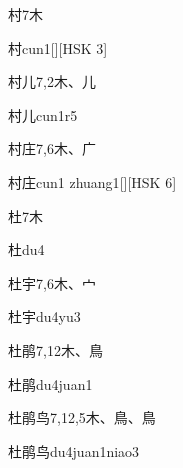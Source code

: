 \begin{Entry}{村}{7}{⽊}
  \begin{Phonetics}{村}{cun1}[][HSK 3]
  \end{Phonetics}
\end{Entry}

\begin{Entry}{村儿}{7,2}{⽊、⼉}
  \begin{Phonetics}{村儿}{cun1r5}
  \end{Phonetics}
\end{Entry}

\begin{Entry}{村庄}{7,6}{⽊、⼴}
  \begin{Phonetics}{村庄}{cun1 zhuang1}[][HSK 6]
  \end{Phonetics}
\end{Entry}

\begin{Entry}{杜}{7}{⽊}
  \begin{Phonetics}{杜}{du4}
  \end{Phonetics}
\end{Entry}

\begin{Entry}{杜宇}{7,6}{⽊、⼧}
  \begin{Phonetics}{杜宇}{du4yu3}
  \end{Phonetics}
\end{Entry}

\begin{Entry}{杜鹃}{7,12}{⽊、⿃}
  \begin{Phonetics}{杜鹃}{du4juan1}
  \end{Phonetics}
\end{Entry}

\begin{Entry}{杜鹃鸟}{7,12,5}{⽊、⿃、⿃}
  \begin{Phonetics}{杜鹃鸟}{du4juan1niao3}
  \end{Phonetics}
\end{Entry}

